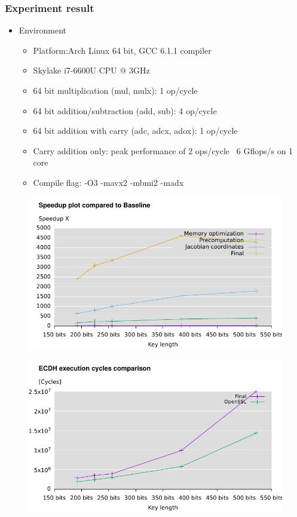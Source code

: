 \begin{frame}
  \frametitle{Experiment result}
  \begin{itemize}
  \item{Environment
  \begin{itemize}
  \setlength\itemsep{0.5em}
  \item{Platform:Arch Linux 64 bit, GCC 6.1.1 compiler}
  \item{Skylake i7-6600U CPU @ 3GHz}
  \item{64 bit multiplication (mul, mulx): 1 op/cycle}
  \item{64 bit addition/subtraction (add, sub): 4 op/cycle}
  \item{64 bit addition with carry (adc, adcx, adox): 1 op/cycle}
  \item{Carry addition only: peak performance of 2 ops/cycle ~6 Gflops/s on 1 core}
  \item{Compile flag: -O3 -mavx2 -mbmi2 -madx}
  \end{itemize}
}
  \setlength\itemsep{1.5em}
  \end{itemize}
\end{frame}
\begin{frame}
\begin{figure}\flushleft		
\includegraphics[scale=0.9, trim={0 0 0 0}]{speedup}		
\end{figure}
\end{frame}
\begin{frame}
\begin{figure}\flushleft		
\includegraphics[scale=0.9, trim={0 0 0 0}]{ecdh}		
\end{figure}
\end{frame}
